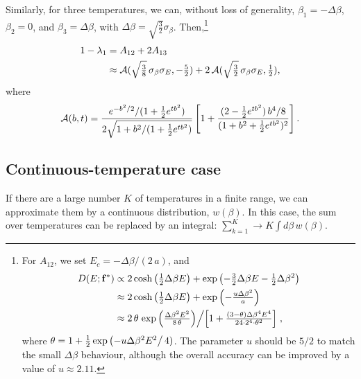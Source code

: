 \documentclass{gMOS2e}
\begin{document}
Similarly,
for three  temperatures,
%
we can, without loss of generality,
$\beta_1 = -\Delta \beta$,
$\beta_2 = 0$,
and
$\beta_3 = \Delta \beta$,
with
$\Delta \beta = \sqrt{\frac 3 2} \sigma_\beta$.
%
Then,\footnote{
%
For $A_{12}$,
we set $E_c = -\Delta \beta/(2 \, a)$,
and
\begin{align*}
D(E; \mathbf{f}^*)
&\propto
2 \cosh\left(
  \tfrac{1}{2} \Delta \beta E
\right)
+
\exp\left(
  -\tfrac{3}{2} \Delta \beta E
  -\tfrac{1}{2} \Delta \beta^2
\right)
\\
&\approx
2 \cosh\left(
  \tfrac{1}{2} \Delta \beta E
\right)
+
\exp\left(
  -\tfrac{ u \Delta \beta^2 }{ a }
\right)
\\
&\approx
2 \, \theta
\left.
  \exp\left(
    \tfrac{\Delta \beta^2 E^2} { 8 \, \theta }
  \right)
\middle/
  \left[
    1
    +
    \tfrac{ (3 - \theta) \Delta \beta^4 E^4 }
    { 24 \cdot 2^4 \cdot \theta^2 }
  \right]
\right.,
\end{align*}
where
$\theta = 1 + \frac 1 2 \exp\left(-u \Delta \beta^2 E^2\right/4)$.
%
The parameter $u$ should be $5/2$
to match the small $\Delta \beta$ behaviour,
although the overall accuracy can be improved
by a value of $u \approx 2.11$.
}
%
\begin{align}
1 - \lambda_1
&= A_{12} + 2 A_{13}
\notag \\
&\approx
\mathcal{A}(\sqrt{\tfrac 3 8} \, \sigma_\beta \sigma_E, -\tfrac 5 2)
+
2 \, \mathcal{A}(\sqrt{\tfrac 3 2} \, \sigma_\beta \sigma_E, \tfrac 1 2),
\label{eq:lambda1_threeT}
\end{align}
where
\begin{align*}
\mathcal{A}(b, t)
=
\frac{
  e^{-b^2/2} / (1 + \frac{1}{2}e^{tb^2})
}
{
  2 \sqrt{1 + b^2/(1 + \frac{1}{2} e^{tb^2})}
}
\left[
  1
  +
  \frac{(2 - \frac{1}{2} e^{tb^2}) \, b^4/8}
  { (1 + b^2 + \frac{1}{2} e^{tb^2})^2 }
\right].
\end{align*}




\subsection{Continuous-temperature case}



If there are a large number $K$ of temperatures
in a finite range,
{we can approximate them}
by a continuous distribution, $w(\beta)$.
%
In this case,
the sum over temperatures can be
replaced by an integral:
%
$
\sum_{k = 1}^K
\rightarrow
K \int d\beta \, w(\beta).
$
\end{document}
